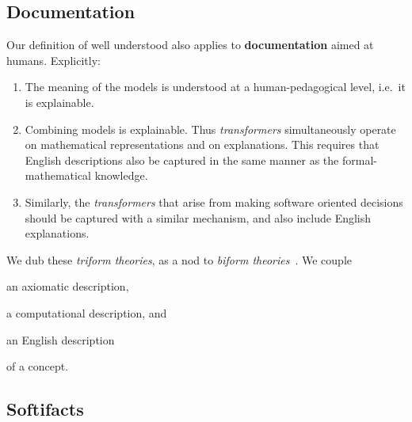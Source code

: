 \documentclass[sigconf,review,anonymous=false]{acmart}
\begin{document}
\subsection{Documentation}
Our definition of well understood also applies to \textbf{documentation} aimed
at humans.  Explicitly:
\begin{enumerate}
\item The meaning of the models is understood at a human-pedagogical
level, i.e.\ it is explainable.
\item Combining models is explainable. Thus \emph{transformers}
  simultaneously operate on mathematical representations
and on explanations. This requires that English descriptions also be
captured in the same manner as the formal-mathematical knowledge.
\item Similarly, the \emph{transformers} that arise from making software
oriented decisions should be captured with a similar mechanism, and also include
English explanations.
\end{enumerate}

We dub these \emph{triform theories}, as a nod to \emph{biform
theories}~\cite{Farmer2007}. We couple 
\begin{enumerate*}
\item an axiomatic description,
\item a computational description, and
\item an English description
\end{enumerate*}
of a concept.


%

\subsection{Softifacts}
\end{document}
